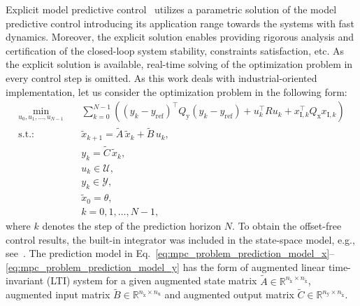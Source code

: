 \documentclass[preprint,12pt]{elsarticle}
\begin{document}
	Explicit model predictive control~\cite{Bemporad_automatica} utilizes a parametric solution of the model predictive control introducing its application range towards the systems with fast dynamics. Moreover, the explicit solution enables providing rigorous analysis and certification of the closed-loop system stability, constraints satisfaction, etc. As the explicit solution is available, real-time solving of the optimization problem in every control step is omitted. As this work deals with industrial-oriented implementation, let us consider the optimization problem in the following form:
	\begin{subequations}
		\label{eq:mpc_problem}
		\begin{eqnarray}
			\label{eq:mpc_problem_cost}
			\min_{u_0,u_{1},\ldots,u_{N-1}} &~& \! \sum_{k=0}^{N-1} \! \left( (y_k-y_\mathrm{ref})^{\intercal} Q_\mathrm{y} (y_k-y_\mathrm{ref}) + u_{k}^{\intercal} R u_{k} + x_{\mathrm{I},k}^{\intercal} Q_\mathrm{x} x_{\mathrm{I},k} \right)  \\
			\label{eq:mpc_problem_prediction_model_x}
			\mathrm{s.t.\!:} &~& \widetilde{x}_{k+1} = \widetilde{A}\,\widetilde{x}_{k} + \widetilde{B}\,u_{k}, \\
			\label{eq:mpc_problem_prediction_model_y}
			&~& y_{k} = \widetilde{C}\,\widetilde{x}_{k}, \\
			\label{eq:mpc_problem_input_constraints}
			&~& u_{k} \in \mathcal{U}, \\
			\label{eq:mpc_problem_state_constraints}
			&~& y_{k} \in \mathcal{Y}, \\
			\label{eq:mpc_problem_initial_coindition}
			&~& \widetilde{x}_{0} = \theta, \\
			\label{eq:mpc_problem_k_range}
			&~& k = 0,1,\ldots, N-1,
		\end{eqnarray}
	\end{subequations}
	where $k$ denotes the step of the prediction horizon $N$. 
	To obtain the offset-free control results, the built-in integrator was included in the state-space model, e.g., see~\cite{Ruscio_MPC_integral}. 
	The prediction model in Eq.~\eqref{eq:mpc_problem_prediction_model_x}--\eqref{eq:mpc_problem_prediction_model_y} has the form of augmented linear time-invariant (LTI) system for a given augmented state matrix $\widetilde{A} \in \mathbb{R}^{n_{\widetilde{\mathrm{x}}} \times n_{\widetilde{\mathrm{x}}}}$, augmented input matrix $\widetilde{B} \in \mathbb{R}^{n_{\widetilde{\mathrm{x}}} \times n_{\mathrm{u}}}$ and augmented output matrix $\widetilde{C} \in \mathbb{R}^{n_{\mathrm{y}} \times n_{\widetilde{\mathrm{x}}}}$. 
\end{document}
